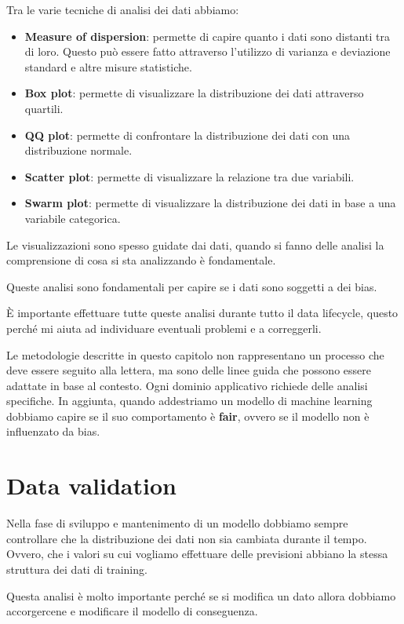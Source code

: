 Tra le varie tecniche di analisi dei dati abbiamo:
\begin{itemize}
      \item \textbf{Measure of dispersion}: permette di capire quanto i dati sono
            distanti tra di loro. Questo può essere fatto attraverso l'utilizzo
            di varianza e deviazione standard e altre misure statistiche.
      \item \textbf{Box plot}: permette di visualizzare la distribuzione dei dati
            attraverso quartili.
      \item \textbf{QQ plot}: permette di confrontare la distribuzione dei dati
            con una distribuzione normale.
      \item \textbf{Scatter plot}: permette di visualizzare la relazione tra due
            variabili.
      \item \textbf{Swarm plot}: permette di visualizzare la distribuzione dei dati
            in base a una variabile categorica.
\end{itemize}
Le visualizzazioni sono spesso guidate dai dati, quando si fanno delle analisi
la comprensione di cosa si sta analizzando è fondamentale.

Queste analisi sono fondamentali per capire se i dati sono soggetti a dei bias.

È importante effettuare tutte queste analisi durante tutto il data lifecycle,
questo perché mi aiuta ad individuare eventuali problemi e a correggerli.

Le metodologie descritte in questo capitolo non rappresentano un processo che deve
essere seguito alla lettera, ma sono delle linee guida che possono essere adattate
in base al contesto. Ogni dominio applicativo richiede delle analisi specifiche.
In aggiunta, quando addestriamo un modello di machine learning dobbiamo capire se
il suo comportamento è \textbf{fair}, ovvero se il modello non è influenzato da
bias.
\section{Data validation}
Nella fase di sviluppo e mantenimento di un modello dobbiamo sempre controllare
che la distribuzione dei dati non sia cambiata durante il tempo.
Ovvero, che i valori su cui vogliamo effettuare delle previsioni abbiano la stessa
struttura dei dati di training.

Questa analisi è molto importante perché se si modifica un dato allora dobbiamo
accorgercene e modificare il modello di conseguenza.

